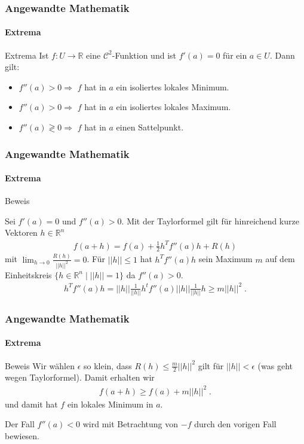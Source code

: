 \documentclass{beamer}
\begin{document}
\begin{frame}
    \frametitle{Angewandte Mathematik}
\framesubtitle{Extrema}
    \begin{block}{Extrema}
 Ist $f: U  \to \mathbb{R}$ eine $\mathcal{C}^2$-Funktion und ist $f'(a) = 0$ für ein $a \in U$. Dann gilt:
\begin{itemize}
\item $f''(a) > 0 \Rightarrow $ $f$ hat in $a$ ein isoliertes lokales Minimum.
\item $f''(a) > 0 \Rightarrow $ $f$ hat in $a$ ein isoliertes lokales Maximum.
\item $f''(a) \gtrless 0 \Rightarrow $ $f$ hat in $a$ einen Sattelpunkt.
\end{itemize} 
\end{block}
 \end{frame}


\begin{frame}
    \frametitle{Angewandte Mathematik}
\framesubtitle{Extrema}
    \begin{block}{Beweis}

Sei $f'(a) = 0$ und $f''(a) > 0$. Mit der Taylorformel gilt für hinreichend kurze Vektoren $h \in \mathbb{R}^n$
\begin{align*}
f(a + h) = f(a) + \frac{1}{2} h^T f''(a) h + R(h)
\end{align*}
mit $\lim_{h \to 0} \frac{R(h)}{ ||h||^2} = 0$. Für $||h|| \leq 1$ hat $ h^T f''(a) h $ sein Maximum $m$ auf dem Einheitskreis $\{ h \in \mathbb{R}^n \; | \; ||h|| = 1 \}$ da $f''(a) > 0$.
\begin{align*}
 h^T f''(a) h  = ||h|| \frac{1}{||h||} h^t  f''(a)  ||h|| \frac{1}{||h||} h \geq m ||h||^2 \;.
\end{align*}
\end{block}
 \end{frame}



\begin{frame}
    \frametitle{Angewandte Mathematik}
\framesubtitle{Extrema}
    \begin{block}{Beweis}
Wir wählen $\epsilon$ so klein, dass $R(h) \leq \frac{m}{2}  ||h||^2$ gilt für $||h|| < \epsilon$  (was geht wegen Taylorformel).
Damit erhalten wir
\begin{align*}
f(a + h) \geq f(a) +  m ||h||^2 \;.
\end{align*}
und damit hat $f$ ein lokales Minimum in $a$.

Der Fall $f''(a) < 0$ wird mit Betrachtung von $-f$ durch den vorigen Fall bewiesen.
\end{block}
 \end{frame}
\end{document}
